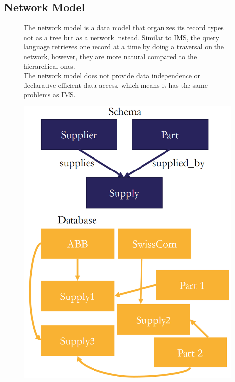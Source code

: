 \subsection{Network Model}
\begin{figure}[H]
\begin{minipage}[t]{.5\textwidth}
The network model is a data model that organizes its record types not as a tree but as a network instead. Similar to IMS, the query language retrieves one record at a time by doing a traversal on the network, however, they are more natural compared to the hierarchical ones. \\
The network model does not provide data independence or declarative efficient data access, which means it has the same problems as IMS.
\end{minipage}
\begin{minipage}[t]{.5\textwidth}
\strut\vspace*{-\baselineskip}\newline
\centering
\includegraphics[width=.6\textwidth]{images/Network_Model.PNG}
\label{Network_Model_instance}
\end{minipage}
\end{figure}

